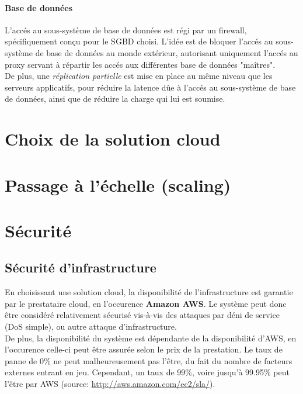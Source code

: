 \paragraph{Base de données}

L'accés au sous-système de base de données est régi par un firewall,
spécifiquement conçu pour le SGBD choisi. L'idée est de bloquer l'accés au
sous-système de base de données au monde extérieur, autorisant uniquement
l'accés au proxy servant à répartir les accés aux différentes base de données
"maîtres". \\

De plus, une \emph{réplication partielle} est mise en place au même niveau que
les serveurs applicatifs, pour réduire la latence dûe à l'accés au sous-système
de base de données, ainsi que de réduire la charge qui lui est soumise.

\section{Choix de la solution cloud}
\label{sec:choix-solution-cloud}
\section{Passage à l'échelle (scaling)}
\label{sec:scaling}

\section{Sécurité}
\label{sec:securite}

\subsection{Sécurité d'infrastructure}
\label{subsec:securite-infrastructure}

En choisissant une solution cloud, la disponibilité de l'infrastructure est
garantie par le prestataire cloud, en l'occurence \textbf{Amazon AWS}. Le
système peut donc être considéré relativement sécurisé vis-à-vis des attaques
par déni de service (DoS simple), ou autre attaque d'infrastructure. \\

De plus, la disponibilité du système est dépendante de la disponibilité d'AWS,
en l'occurence celle-ci peut être assurée selon le prix de la prestation. Le
taux de panne de 0\% ne peut malheureusement pas l'être, du fait du nombre de
facteurs externes entrant en jeu. Cependant, un taux de 99\%, voire jusqu'à
99.95\% peut l'être par AWS (source: \url{http://aws.amazon.com/ec2/sla/}). \\

